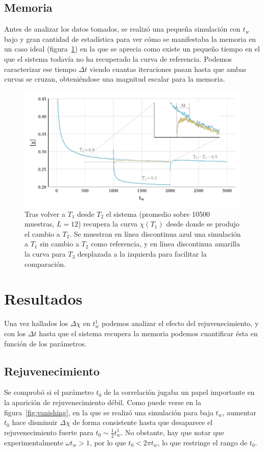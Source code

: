 \documentclass[11pt]{report}
\begin{document}
\section{Memoria}

Antes de analizar los datos tomados, se realizó una pequeña simulación
con $t_w$ bajo y gran cantidad de estadística para ver cómo se
manifestaba la memoria en un caso ideal (figura~\ref{fig:memorytoy})
en la que se aprecia como existe un pequeño tiempo en el que el
sistema todavía no ha recuperado la curva de referencia. Podemos
caracterizar ese tiempo $Δt$ viendo cuantas iteraciones pasan hasta
que ambas curvas se cruzan, obteniéndose una magnitud escalar para la
memoria.

\begin{figure}
  \centering
  \includegraphics{../study_cases/memory_toy/memorytoy_handedit.pdf}
  \caption{Tras volver a $T_1$ desde $T_2$ el sistema (promedio sobre
    10500 muestras, $L=12$) recupera la curva $χ(T_1)$ desde donde se
    produjo el cambio a $T_2$. Se muestran en línea discontinua azul
    una simulación a $T_1$ sin cambio a $T_2$ como referencia, y en
    línea discontinua amarilla la curva para $T_3$ desplazada a la
    izquierda para facilitar la comparación.}
  \label{fig:memorytoy}
\end{figure}

\chapter{Resultados}
Una vez hallados los $Δχ$ en $t_w^1$ podemos analizar el efecto del
rejuvenecimiento, y con los $Δt$ hasta que el sistema recupera la
memoria podemos cuantificar ésta en función de los parámetros.

\section{Rejuvenecimiento}
Se comprobó si el parámetro $t_0$ de la correlación jugaba un papel
importante en la aparición de rejuvenecimiento débil. Como puede verse
en la figura~\ref{fig:vanishing}, en la que se realizó una simulación
para baja $t_w$, aumentar $t_0$ hace disminuir $Δχ$ de forma consistente
hasta que desaparece el rejuvenecimiento fuerte para
$t_0∼\frac{1}{2}t_w^1$. No obstante, hay que notar que experimentalmente
$ωt_w >1$, por lo que $t_0 < 2πt_w $, lo que restringe el rango de
$t_0$.
\end{document}
